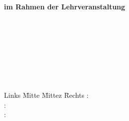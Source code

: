 \documentclass[12pt,oneside,titlepage,listof=totoc,bibliography=totoc]{scrartcl}
\newif\ifde
\newif\ifen
\newcommand{\langde}[1]{%
   \ifde\selectlanguage{ngerman}#1\fi}
\newcommand{\langen}[1]{%
   \ifen\selectlanguage{english}#1\fi}
\begin{document}
\begin{titlepage}
\begin{center}
		\textbf{im Rahmen der Lehrveranstaltung}\\
		\textbf{\myLehrveranstaltung}\\
		\vspace{1.8cm}
		\langde{über das Thema}
		\langen{on the subject}\\
    \vspace{0.5cm}
		\large{\textbf{\myTitel}}\\
		\large{\mySubTitel}\\
		\vspace{1cm}
    \langde{von}\\
    \vspace{0.5cm}
    \begin{Large}{\myAutor}\end{Large}\\
	\end{center}
	\normalsize
	\vfill
	\begin{tabbing}
		Links \= Mitte \=Mittez \= Rechts\kill
		\langde{Betreuer} %
		\langen{Advisor}: \> \> \>\myBetreuer\\
		\langde{Matrikelnummer}
				\langen{Matriculation Number}: \> \> \>\myMatrikelNr\\
		\langde{Abgabedatum}
		\langen{Submission}: \> \> \> \myAbgabeDatum
    \\
	\end{tabbing}
\end{titlepage}


%

\setcounter{page}{2}
\clearpage
\tableofcontents
\newpage
\setcounter{tocdepth}{2} %
\end{document}
